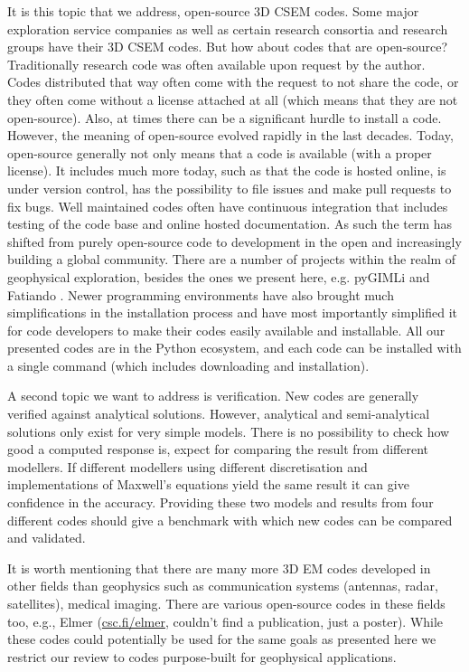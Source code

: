\documentclass[
    paper,
  ]{geophysics}
\begin{document}
It is this topic that we address, open-source 3D CSEM codes. Some major
exploration service companies as well as certain research consortia and
research groups have their 3D CSEM codes. But how about codes that are
open-source? Traditionally research code was often available upon request by
the author. Codes distributed that way often come with the request to not share
the code, or they often come without a license attached at all (which means
that they are not open-source). Also, at times there can be a significant
hurdle to install a code. However, the meaning of open-source evolved rapidly
in the last decades. Today, open-source generally not only means that a code is
available (with a proper license). It includes much more today, such as that
the code is hosted online, is under version control, has the possibility to
file issues and make pull requests to fix bugs. Well maintained codes often
have continuous integration that includes testing of the code base and online
hosted documentation. As such the term has shifted from purely open-source code
to development in the open and increasingly building a global community. There
are a number of projects within the realm of geophysical exploration, besides
the ones we present here, e.g. pyGIMLi
\citep{CAG.17.Rucker} and Fatiando \citep{JOSS.18.Uieda}. Newer programming environments  have also brought much
simplifications in the installation process and have most importantly
simplified it for code developers to make their codes easily available and
installable. All our presented codes are in the Python ecosystem, and each code
can be installed with a single command (which includes downloading and
installation).

A second topic we want to address is verification. New codes are generally
verified against analytical solutions. However, analytical and semi-analytical
solutions only exist for very simple models. There is no possibility to check
how good a computed response is, expect for comparing the result from different
modellers. If different modellers using different discretisation and
implementations of Maxwell's equations yield the same result it can give
confidence in the accuracy. Providing these two models and results from four
different codes should give a benchmark with which new codes can be compared
and validated.

It is worth mentioning that there are many more 3D EM codes developed in other
fields than geophysics such as communication systems (antennas, radar,
satellites), medical imaging. There are various open-source codes in these
fields  too, e.g., Elmer
(\href{http://www.csc.fi/elmer}{csc.fi/elmer}, couldn't find a publication,
just a poster). While these codes could potentially be used for the same goals
as presented here we restrict our review to codes purpose-built for geophysical
applications.
\end{document}
